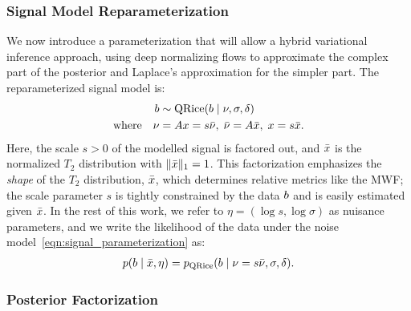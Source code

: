 \subsubsection{Signal Model Reparameterization}

We now introduce a parameterization that will allow a hybrid variational inference approach, using deep normalizing flows to approximate the complex part of the posterior and Laplace's approximation for the simpler part.
The reparameterized signal model is:
\begin{align}\label{eqn:signal_parameterization}
    \begin{aligned}
        b                & \sim \operatorname{QRice} (b \mid \nu, \sigma, \delta)                                                           \\
        \text{where} \quad \nu & = A x = s \bar{\nu}, \; \bar{\nu} = A \bar{x}, \; x = s \bar{x}.
    \end{aligned}
\end{align}
Here, the scale $s > 0$ of the modelled signal is factored out, and $\bar{x}$ is the normalized $T_2$ distribution with $\lVert \bar{x} \rVert_1 = 1$.
This factorization emphasizes the \textit{shape} of the $T_2$ distribution, $\bar{x}$, which determines relative metrics like the \gls*{MWF};
the scale parameter $s$ is tightly constrained by the data $b$ and is easily estimated given $\bar{x}$.
In the rest of this work, we refer to $\eta = (\log s, \log \sigma)$ as nuisance parameters, and we write the likelihood of the data under the noise model~\eqref{eqn:signal_parameterization} as:
\begin{align}\label{eqn:signal_likelihood}
    p(b \mid \bar{x}, \eta) = p_{\operatorname{QRice}}(b \mid \nu = s \bar{\nu}, \sigma, \delta).
\end{align}

\subsubsection{Posterior Factorization}\label{subsubsec:posterior_factorization}

